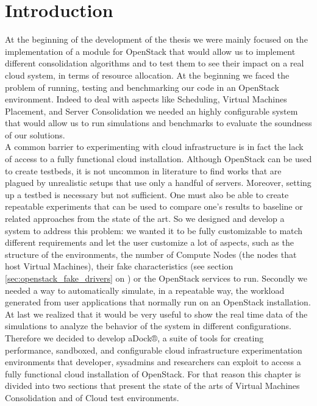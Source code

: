 




\section{Introduction}
\label{sec:sota_intro}
At the beginning of the development of the thesis we were mainly focused on the implementation of a module for OpenStack that would allow us to implement different consolidation algorithms and to test them to see their impact on a real cloud system, in terms of resource allocation. At the beginning we faced the problem of running, testing and benchmarking our code in an OpenStack environment. Indeed to deal with aspects like Scheduling, Virtual Machines Placement, and Server Consolidation we needed an highly configurable system that would allow us to run simulations and benchmarks to evaluate the soundness of our solutions.\\ 
A common barrier to experimenting with cloud infrastructure is in fact the lack of access to a fully functional cloud installation. Although OpenStack can be used to create testbeds, it is not uncommon in literature to find works that are plagued by unrealistic setups that use only a handful of servers. Moreover, setting up a testbed is necessary but not sufficient. One must also be able to create repeatable experiments that can be used to compare one’s results to baseline or related approaches from the state of the art.
So we designed and develop a system to address this problem: we wanted it to be fully customizable to match different requirements and let the user customize a lot of aspects, such as the structure of the environments, the number of Compute Nodes (the nodes that host Virtual Machines), their fake characteristics (see section \ref{sec:openstack_fake_drivers} on ) or the OpenStack services to run. Secondly we needed a way to automatically simulate, in a repeatable way, the workload generated from user applications that normally run on an OpenStack installation. At last we realized that it would be very useful to show the real time data of the simulations to analyze the behavior of the system in different configurations.
Therefore we decided to develop aDock®, a suite of tools for creating performance, sandboxed, and configurable cloud infrastructure experimentation environments that developer, sysadmins and researchers can exploit to access a fully functional cloud installation of OpenStack.
For that reason this chapter is divided into two sections that present the state of the arts of Virtual Machines Consolidation and of Cloud test environments.



